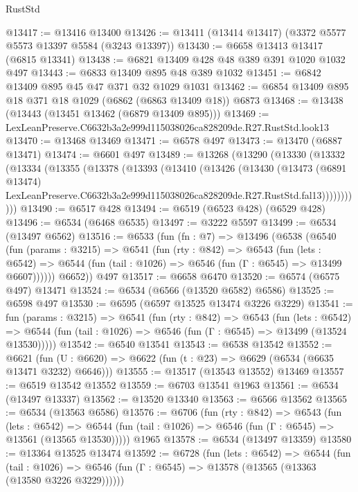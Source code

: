 \begin{lexlean}{RustStd}
\begin{coremodule}
@13417 := @13416 @13400
@13426 := @13411 (@13414 @13417) (@3372 @5577 @5573 @13397 @5584 (@3243 @13397))
@13430 := @6658 @13413 @13417 (@6815 @13341)
@13438 := @6821 @13409 @428 @48 @389 @391 @1020 @1032 @497
@13443 := @6833 @13409 @895 @48 @389 @1032
@13451 := @6842 @13409 @895 @45 @47 @371 @32 @1029 @1031
@13462 := @6854 @13409 @895 @18 @371 @18 @1029 (@6862 (@6863 @13409 @18)) @6873
@13468 := @13438 (@13443 (@13451 @13462 (@6879 @13409 @895)))
@13469 := LexLeanPreserve.C6632b3a2e999d115038026ca828209de.R27.RustStd.look13
@13470 := @13468 @13469
@13471 := @6578 @497
@13473 := @13470 (@6887 @13471)
@13474 := @6601 @497
@13489 := @13268
    (@13290
      (@13330
        (@13332
          (@13334
            (@13355
              (@13378
                (@13393
                  (@13410
                    (@13426
                      (@13430
                        (@13473
                          (@6891 @13474)
                          LexLeanPreserve.C6632b3a2e999d115038026ca828209de.R27.RustStd.fal13)))))))))))
@13490 := @6517 @428
@13494 := @6519 (@6523 @428) (@6529 @428)
@13496 := @6534 (@6468 @6535)
@13497 := @3222 @5597
@13499 := @6534 (@13497 @6562)
@13516 := @6533
    (fun (fn : @7) =>
    @13496
      (@6538
        (@6540
          (fun (params : @3215) =>
          @6541
            (fun (rty : @842) =>
            @6543
              (fun (lets : @6542) =>
              @6544 (fun (tail : @1026) => @6546 (fun (Γ : @6545) => @13499 @6607))))))
        @6652))
    @497
@13517 := @6658 @6470
@13520 := @6574 (@6575 @497) @13471
@13524 := @6534 (@6566 (@13520 @6582) @6586)
@13525 := @6598 @497
@13530 := @6595 (@6597 @13525 @13474 @3226 @3229)
@13541 := fun (params : @3215) =>
  @6541
    (fun (rty : @842) =>
    @6543
      (fun (lets : @6542) =>
      @6544 (fun (tail : @1026) => @6546 (fun (Γ : @6545) => @13499 (@13524 @13530)))))
@13542 := @6540 @13541
@13543 := @6538 @13542
@13552 := @6621
    (fun (U : @6620) => @6622 (fun (t : @23) => @6629 (@6534 (@6635 @13471 @3232) @6646)))
@13555 := @13517 (@13543 @13552) @13469
@13557 := @6519 @13542 @13552
@13559 := @6703 @13541 @1963
@13561 := @6534 (@13497 @13337)
@13562 := @13520 @13340
@13563 := @6566 @13562
@13565 := @6534 (@13563 @6586)
@13576 := @6706
    (fun (rty : @842) =>
    @6543
      (fun (lets : @6542) =>
      @6544 (fun (tail : @1026) => @6546 (fun (Γ : @6545) => @13561 (@13565 @13530)))))
    @1965
@13578 := @6534 (@13497 @13359)
@13580 := @13364 @13525 @13474
@13592 := @6728
    (fun (lets : @6542) =>
    @6544
      (fun (tail : @1026) =>
      @6546 (fun (Γ : @6545) => @13578 (@13565 (@13363 (@13580 @3226 @3229))))))

\end{coremodule}
\end{lexlean}
